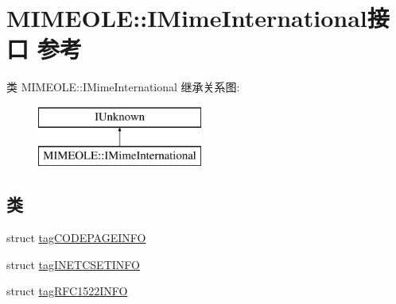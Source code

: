 \hypertarget{interface_m_i_m_e_o_l_e_1_1_i_mime_international}{}\section{M\+I\+M\+E\+O\+LE\+:\+:I\+Mime\+International接口 参考}
\label{interface_m_i_m_e_o_l_e_1_1_i_mime_international}
类 M\+I\+M\+E\+O\+LE\+:\+:I\+Mime\+International 继承关系图\+:\begin{figure}[H]
\begin{center}
\leavevmode
\includegraphics[height=2.000000cm]{interface_m_i_m_e_o_l_e_1_1_i_mime_international}
\end{center}
\end{figure}
\subsection*{类}
\begin{DoxyCompactItemize}
\item 
struct \hyperlink{struct_m_i_m_e_o_l_e_1_1_i_mime_international_1_1tag_c_o_d_e_p_a_g_e_i_n_f_o}{tag\+C\+O\+D\+E\+P\+A\+G\+E\+I\+N\+FO}
\item 
struct \hyperlink{struct_m_i_m_e_o_l_e_1_1_i_mime_international_1_1tag_i_n_e_t_c_s_e_t_i_n_f_o}{tag\+I\+N\+E\+T\+C\+S\+E\+T\+I\+N\+FO}
\item 
struct \hyperlink{struct_m_i_m_e_o_l_e_1_1_i_mime_international_1_1tag_r_f_c1522_i_n_f_o}{tag\+R\+F\+C1522\+I\+N\+FO}
\end{DoxyCompactItemize}
